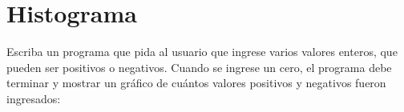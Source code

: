 \section{Histograma}

Escriba un programa que pida al usuario que ingrese varios valores
enteros, que pueden ser positivos o negativos. Cuando se ingrese un
cero, el programa debe terminar y mostrar un gráfico de cuántos valores
positivos y negativos fueron ingresados:
